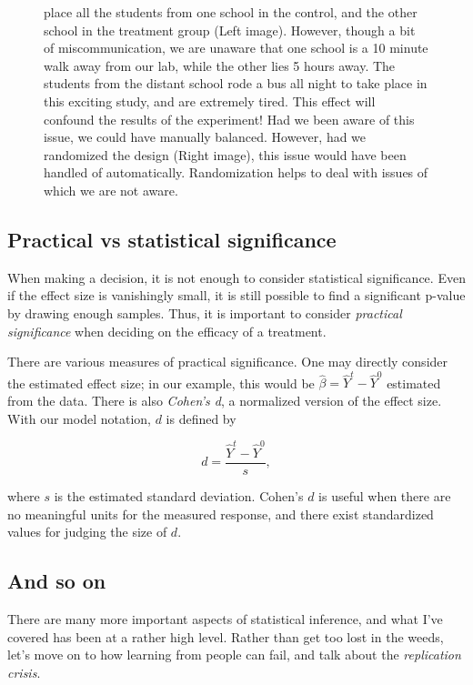 \documentclass{tufte-handout}
\begin{document}
\begin{figure}[!ht]
{  place all the students from one school in the control, and the other
  school in the treatment group (Left image). However, though a bit of
  miscommunication, we are unaware that one school is a 10 minute walk away
  from our lab, while the other lies 5 hours away. The students from the
  distant school rode a bus all night to take place in this exciting
  study, and are extremely tired. This effect will confound the results
  of the experiment! Had we been aware of this issue, we could have manually
  balanced. However, had we randomized the design (Right image), this issue
  would have been handled of automatically. Randomization helps to
  deal with issues of which we are not aware.}
  \label{fig:randomize}
\end{figure}

\subsection{Practical vs statistical significance}
\label{sec:orgf5094ed}
When making a decision, it is not enough to consider statistical significance.
Even if the effect size is vanishingly small, it is still possible to find a
significant p-value by drawing enough samples. Thus, it is important to consider
\emph{practical significance} when deciding on the efficacy of a treatment.

There are various measures of practical significance. One may directly consider
the estimated effect size; in our example, this would be
\(\hat{\beta}=\hat{Y}^t-\hat{Y}^0\) estimated from the data. There is also
\emph{Cohen's d}, a normalized version of the effect size. With our model notation,
\(d\) is defined by

\begin{equation}\label{eq:cohen}
  d = \frac{\hat{Y}^t-\hat{Y}^0}{s},
\end{equation}

where \(s\) is the estimated standard deviation. Cohen's \(d\) is useful when there
are no meaningful units for the measured response, and there exist standardized
values for judging the size of \(d\).
\subsection{And so on}
\label{sec:org196b26b}
There are many more important aspects of statistical inference, and what I've
covered has been at a rather high level. Rather than get too lost in the weeds,
let's move on to how learning from people can fail, and talk about the
\emph{replication crisis}.
\end{document}
